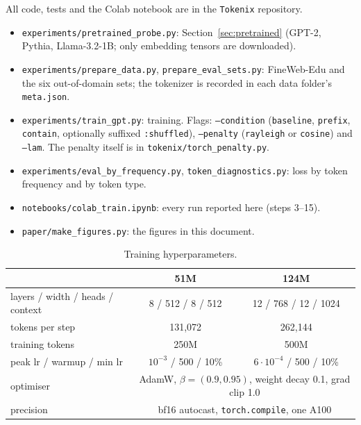 \documentclass[11pt]{article}
\begin{document}
All code, tests and the Colab notebook are in the \texttt{Tokenix} repository.
\begin{itemize}
  \item \texttt{experiments/pretrained\_probe.py}: Section~\ref{sec:pretrained}
  (GPT-2, Pythia, Llama-3.2-1B; only embedding tensors are downloaded).
  \item \texttt{experiments/prepare\_data.py}, \texttt{prepare\_eval\_sets.py}:
  FineWeb-Edu and the six out-of-domain sets; the tokenizer is recorded in each data
  folder's \texttt{meta.json}.
  \item \texttt{experiments/train\_gpt.py}: training. Flags:
  \texttt{--condition} (\texttt{baseline}, \texttt{prefix}, \texttt{contain},
  optionally suffixed \texttt{:shuffled}), \texttt{--penalty} (\texttt{rayleigh} or
  \texttt{cosine}) and \texttt{--lam}. The penalty itself is in
  \texttt{tokenix/torch\_penalty.py}.
  \item \texttt{experiments/eval\_by\_frequency.py}, \texttt{token\_diagnostics.py}:
  loss by token frequency and by token type.
  \item \texttt{notebooks/colab\_train.ipynb}: every run reported here (steps 3--15).
  \item \texttt{paper/make\_figures.py}: the figures in this document.
\end{itemize}

\begin{table}[h]
\centering
\small
\begin{tabular}{lcc}
\toprule
 & 51M & 124M \\
\midrule
layers / width / heads / context & 8 / 512 / 8 / 512 & 12 / 768 / 12 / 1024 \\
tokens per step & 131{,}072 & 262{,}144 \\
training tokens & 250M & 500M \\
peak lr / warmup / min lr & $10^{-3}$ / 500 / 10\% & $6\cdot10^{-4}$ / 500 / 10\% \\
optimiser & \multicolumn{2}{c}{AdamW, $\beta=(0.9,0.95)$, weight decay 0.1, grad clip 1.0} \\
precision & \multicolumn{2}{c}{bf16 autocast, \texttt{torch.compile}, one A100} \\
\bottomrule
\end{tabular}
\caption{Training hyperparameters.}
\end{table}
\end{document}
